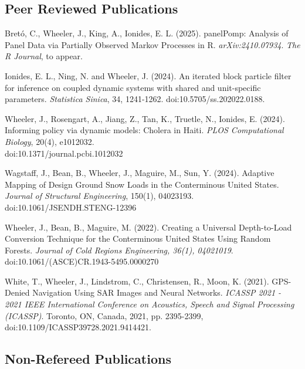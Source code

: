 \documentclass[11pt]{article}
\newenvironment {reflist}
                {
                 \begin{list}{}
                 {\setlength{\labelwidth}{0mm}
                  \setlength{\leftmargin}{8mm}
                  \setlength{\itemindent}{-3mm}
                  \setlength{\labelsep}{0mm}
                  \setlength{\parsep}{0.1 ex}
                  \setlength{\itemsep}{0.1cm}
      \setlength{\topsep}{0.15cm}}} %
   {\end{list}}
\begin{document}
\subsection*{Peer Reviewed Publications}

\begin{reflist}

    \item Bret\'o, C., Wheeler, J., King, A., Ionides, E. L. (2025). panelPomp: Analysis of Panel Data via Partially Observed Markov Processes in R. {\it arXiv:2410.07934}. {\it The R Journal}, to appear.

    \item Ionides, E. L., Ning, N. and Wheeler, J. (2024). An iterated block particle filter for inference on coupled dynamic systems with shared and unit-specific parameters. {\it Statistica Sinica}, 34, 1241-1262. doi:10.5705/ss.202022.0188.

    \item Wheeler, J., Rosengart, A., Jiang, Z., Tan, K., Truetle, N., Ionides, E. (2024). Informing policy via dynamic models: Cholera in Haiti. {\it PLOS Computational Biology}, 20(4), e1012032. \\ doi:10.1371/journal.pcbi.1012032

    \item Wagstaff, J., Bean, B., Wheeler, J., Maguire, M., Sun, Y. (2024). Adaptive Mapping of Design Ground Snow Loads in the Conterminous United States. {\it Journal of Structural Engineering}, 150(1), 04023193. doi:10.1061/JSENDH.STENG-12396

    \item Wheeler, J., Bean, B., Maguire, M. (2022). Creating a Universal Depth-to-Load Conversion Technique for the Conterminous United States Using Random Forests. {\it Journal of Cold Regions Engineering, 36(1), 04021019}. doi:10.1061/(ASCE)CR.1943-5495.0000270

    \item White, T., Wheeler, J., Lindstrom, C., Christensen, R., Moon, K. (2021). GPS-Denied Navigation Using SAR Images and Neural Networks. {\it ICASSP 2021 - 2021 IEEE International Conference on Acoustics, Speech and Signal Processing (ICASSP)}. Toronto, ON, Canada, 2021, pp. 2395-2399, doi:10.1109/ICASSP39728.2021.9414421.

\end{reflist}

\subsection*{Non-Refereed Publications}
\end{document}
